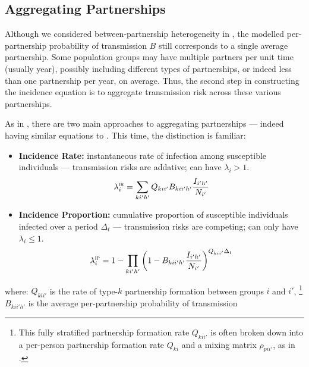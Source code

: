 \subsection{Aggregating Partnerships}\label{foi.prior.part}
Although we considered between-partnership heterogeneity in ,
the modelled per-partnership probability of transmission $B$
still corresponds to a single average partnership.
Some population groups may have multiple partners per unit time (usually year),
possibly including different types of partnerships,
or indeed less than one partnership per year, on average.
Thus, the second step in constructing the incidence equation is to
aggregate transmission risk across these various partnerships.
\par
As in , there are two main approaches to aggregating partnerships
--- indeed having similar equations to .
This time, the distinction is familiar:
\begin{itemize}
  \item \textbf{Incidence Rate:}
  instantaneous rate of infection among susceptible individuals
  --- transmission risks are addative; can have $\lambda_i > 1$.
  \begin{equation}\label{eq:foi.ir}
    \lambda_i^\textsc{ir} = \sum_{ki'h'} Q_{kii'} B_{kii'h'} \frac{{I}_{i'h'}}{N_{i'}}
  \end{equation}
  \item \textbf{Incidence Proportion:}
  cumulative proportion of susceptible individuals infected over a period $\Delta_t$
  --- transmission risks are competing; can only have $\lambda_i \le 1$.
  \begin{equation}\label{eq:foi.ip}
    \lambda_i^\textsc{ip} = 1 - \prod_{ki'h'} {\left(1 - B_{kii'h'} \frac{{I}_{i'h'}}{N_{i'}}\right)}^{Q_{kii'} \Delta_t}
  \end{equation}
\end{itemize}
where:
$Q_{kii'}$ is the rate of type-$k$ partnership formation between groups $i$ and $i'$,%
\footnote{This fully stratified partnership formation rate $Q_{kii'}$ is often broken down into
a per-person partnership formation rate $Q_{ki}$ and a mixing matrix $\rho_{pii'}$,
as in .}
$B_{kii'h'}$ is the average per-partnership probability of transmission

